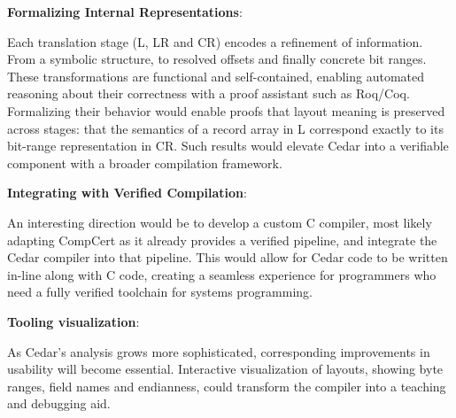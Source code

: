 \textbf{Formalizing Internal Representations}:

Each translation stage (L, LR and CR) encodes
a refinement of information. From a 
symbolic structure, to resolved offsets and finally concrete
bit ranges.
These transformations are functional and self-contained, enabling
automated reasoning about their correctness with a proof assistant such
as Roq/Coq.
Formalizing their behavior would enable proofs that layout meaning
is preserved across stages: that the semantics of a record array
in L correspond exactly to its bit-range representation in CR.
Such results would elevate Cedar into a verifiable component
with a broader compilation framework.

\textbf{Integrating with Verified Compilation}:

An interesting direction would be to develop a custom C compiler,
most likely adapting CompCert as it already provides a verified
pipeline, and integrate the Cedar compiler into that pipeline.
This would allow for Cedar code to be written in-line along with 
C code, creating a seamless experience for programmers who
need a fully verified toolchain for systems programming.

\textbf{Tooling visualization}:

As Cedar's analysis grows more sophisticated, corresponding improvements
in usability will become essential. Interactive visualization of layouts,
showing byte ranges, field names and endianness, could transform the compiler
into a teaching and debugging aid. 
